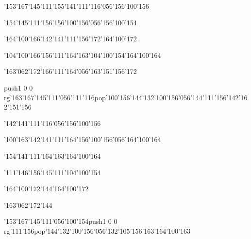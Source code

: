 \null\vfill\ipa\centerline{\enskip\enskip\enskip\enskip\char'153\char'167\char'145\char'111\enskip\enskip\enskip\enskip\char'155\char'141\char'111\char'116\char'056\char'156\char'100\char'156}\medskip\centerline{\enskip\enskip\enskip\enskip\char'154\char'145\char'111\char'156\enskip\char'156\char'100\char'156\char'056\char'156\char'100\char'154}\medskip\centerline{\enskip\enskip\char'164\char'100\char'166\enskip\enskip\char'142\char'141\char'111\char'156\char'172\enskip\enskip\enskip\enskip\char'164\char'100\char'172}\medskip\centerline{\enskip\enskip\enskip\enskip\enskip\enskip\enskip\enskip\enskip\enskip\enskip\enskip\enskip\enskip}\medskip\centerline{\enskip\char'104\char'100\char'166\enskip\char'156\char'111\char'164\char'163\enskip\enskip\char'104\char'100\char'154\enskip\enskip\enskip\enskip\enskip\enskip\enskip\char'164\char'100\char'164}\medskip\centerline{\enskip\enskip\enskip\enskip\char'163\char'062\char'172\enskip\enskip\enskip\enskip\enskip\enskip\enskip\enskip\enskip\enskip\char'166\char'111\char'164\char'056\char'163\char'151\char'156\char'172}\medskip\centerline{\enskip\pdfcolorstack\match push{1 0 0 rg}\char'163\char'167\char'145\char'111\char'056\char'111\char'116\pdfcolorstack\match pop{}\enskip\char'100\char'156\enskip\enskip\enskip\char'144\char'132\char'100\char'156\char'056\char'144\char'111\char'156\enskip\char'142\char'162\char'151\char'156}\medskip\vfill\footline{\hfil\tt\folio\hfil}\eject
\null\vfill\ipa\centerline{\enskip\enskip\enskip\enskip\enskip\enskip\enskip\enskip\enskip\enskip\enskip\char'142\char'141\char'111\char'116\char'056\char'156\char'100\char'156}\medskip\centerline{\enskip\char'100\char'163\enskip\char'142\char'141\char'111\char'164\enskip\char'156\char'100\char'156\char'056\char'164\char'100\char'164}\medskip\centerline{\enskip\enskip\enskip\enskip\enskip\enskip\char'154\char'141\char'111\char'164\char'163\enskip\enskip\enskip\enskip\char'164\char'100\char'164}\medskip\centerline{\enskip\char'111\char'146\enskip\char'156\char'145\char'111\enskip\enskip\enskip\enskip\char'104\char'100\char'154}\medskip\centerline{\enskip\enskip\enskip\enskip\enskip\char'164\char'100\char'172\char'144\enskip\enskip\enskip\enskip\enskip\enskip\enskip\enskip\enskip\enskip\enskip\enskip\char'164\char'100\char'172}\medskip\centerline{\enskip\enskip\enskip\enskip\enskip\enskip\enskip\enskip\enskip\enskip\enskip\enskip\enskip\enskip\enskip\enskip\enskip\enskip\enskip\char'163\char'062\char'172\char'144}\medskip\centerline{\enskip\char'153\char'167\char'145\char'111\char'056\char'100\char'154\enskip\pdfcolorstack\match push{1 0 0 rg}\char'111\char'156\pdfcolorstack\match pop{}\enskip\enskip\enskip\char'144\char'132\char'100\char'156\char'056\char'132\char'105\char'156\enskip\char'163\char'164\char'100\char'163}\medskip\vfill\footline{\hfil\tt\folio\hfil}\eject

